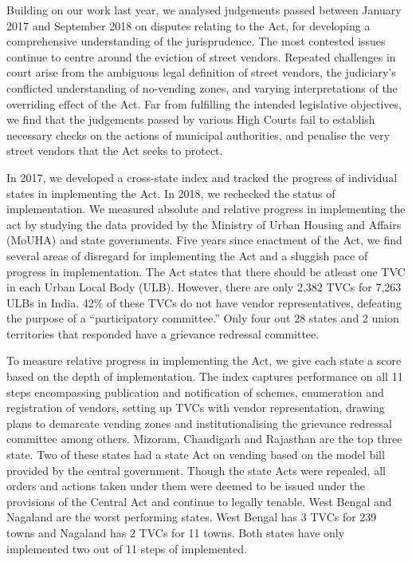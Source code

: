 \documentclass[a4paper, 12pt, twoside]{article}
\begin{document}
{Building on our work last year, we analysed judgements passed between January 2017 and September 2018 on disputes relating to the Act,  for developing a comprehensive understanding of the jurisprudence. The most contested issues continue to centre around the eviction of street vendors. Repeated challenges in court arise from the ambiguous legal definition of street vendors, the judiciary's conflicted understanding of no-vending zones, and varying interpretations of the overriding effect of the Act. Far from fulfilling the intended legislative objectives, we find that the judgements passed by various High Courts fail to establish necessary checks on the actions of municipal authorities, and penalise the very street vendors that the Act seeks to protect.

In 2017, we developed a cross-state index and tracked the progress of individual states in implementing the Act. In 2018, we rechecked the status of implementation. We measured absolute and relative progress in implementing the act by studying the data provided by the Ministry of Urban Housing and Affairs (MoUHA) and state governments. Five years since enactment of the Act, we find several areas of disregard for implementing the Act and a sluggish pace of progress in implementation. The Act states that there should be atleast one TVC in each Urban Local Body (ULB). However, there are only 2,382 TVCs for 7,263 ULBs in India. 42\% of these TVCs do not have vendor representatives, defeating the purpose of a “participatory committee.” Only four out 28 states and 2 union territories that responded have a grievance redressal committee.

To measure relative progress in implementing the Act, we give each state a score based on the depth of implementation. The index captures performance on all 11 steps encompassing publication and notification of schemes, enumeration and registration of vendors, setting up TVCs with vendor representation, drawing plans to demarcate vending zones and institutionalising the grievance redressal committee among others. Mizoram, Chandigarh and Rajasthan are the top three state. Two of these states had a state Act on vending based on the model bill provided by the central government. Though the state Acts were repealed, all orders and actions taken under them were deemed to be issued under the provisions of the Central Act and continue to legally tenable. West Bengal and Nagaland are the worst performing states. West Bengal has 3 TVCs for 239 towns and Nagaland has 2 TVCs for 11 towns. Both states have only implemented two out of 11 steps of implemented.

}
\end{document}
